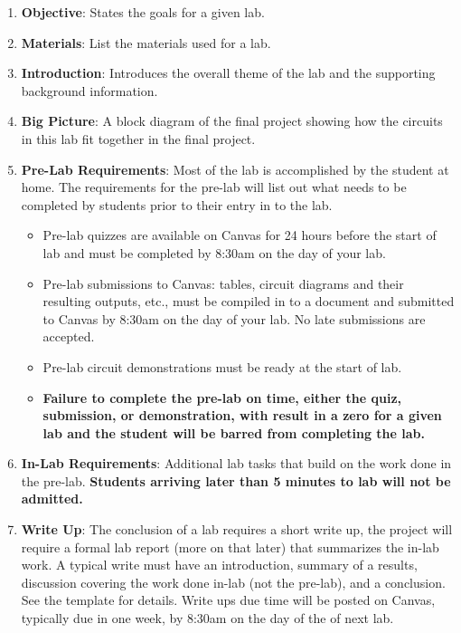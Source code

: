 \begin{enumerate}
	\item \textbf{Objective}: States the goals for a given lab.
	\item \textbf{Materials}: List the materials used for a lab.
	\item \textbf{Introduction}: Introduces the overall theme of the lab and the supporting background information.
	\item \textbf{Big Picture}: A block diagram of the final project showing how the circuits in this lab fit together in the final project. 
	\item \textbf{Pre-Lab Requirements}: Most of the lab is accomplished by the student at home. The requirements for the pre-lab will list out what needs to be completed by students prior to their entry in to the lab.  
		\begin{itemize}
			\item Pre-lab quizzes are available on Canvas for 24 hours before the start of lab and must be completed by 8:30am on the day of your lab. 
			\item Pre-lab submissions to Canvas: tables, circuit diagrams and their resulting outputs, etc., must be compiled in to a document and submitted to Canvas by 8:30am on the day of your lab. No late submissions are accepted.
			\item Pre-lab circuit demonstrations must be ready at the start of lab.
			\item \textbf{Failure to complete the pre-lab on time, either the quiz, submission, or demonstration, with result in a zero for a given lab and the student will be barred from completing the lab.}
		\end{itemize}
	\item \textbf{In-Lab Requirements}: Additional lab tasks that build on the work done in the pre-lab. \textbf{Students arriving later than 5 minutes to lab will not be admitted.}
	\item \textbf{Write Up}: The conclusion of a lab requires a short write up, the project will require a formal lab report (more on that later) that summarizes the in-lab work. A typical write must have an introduction, summary of a results, discussion covering the work done in-lab (not the pre-lab), and a conclusion. See the template for details. Write ups due time will be posted on Canvas, typically due in one week, by 8:30am on the day of the of next lab.
\end{enumerate}

